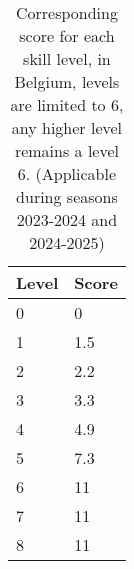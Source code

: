 \begin{table}
    \begin{tabular}{|l|l|}
        \hline Level & Score \\ \hline
        0 & 0 \\
        1 & 1.5 \\
        2 & 2.2 \\
        3 & 3.3 \\
        4 & 4.9 \\
        5 & 7.3 \\
        6 & 11 \\
        7 & 11 \\
        8 & 11 \\ \hline
    \end{tabular}
    \caption[level to score map]{Corresponding score for each skill level, in Belgium, levels are limited to 6, any higher level remains a level 6. (Applicable during seasons 2023-2024 and 2024-2025)}
    \label{tbl:Score mapping}
\end{table}

